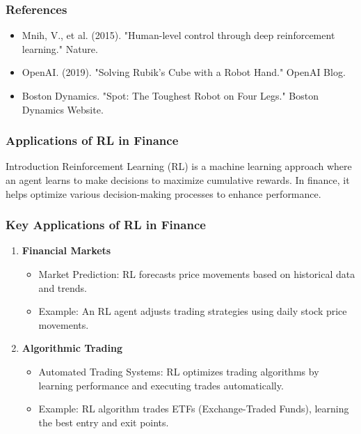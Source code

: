 \documentclass[aspectratio=169]{beamer}
\begin{document}
\begin{frame}[fragile]
    \frametitle{References}
    \begin{itemize}
        \item Mnih, V., et al. (2015). "Human-level control through deep reinforcement learning." Nature.
        \item OpenAI. (2019). "Solving Rubik's Cube with a Robot Hand." OpenAI Blog.
        \item Boston Dynamics. "Spot: The Toughest Robot on Four Legs." Boston Dynamics Website.
    \end{itemize}
\end{frame}

\begin{frame}
    \frametitle{Applications of RL in Finance}
    \begin{block}{Introduction}
        Reinforcement Learning (RL) is a machine learning approach where an agent learns to make decisions to maximize cumulative rewards. In finance, it helps optimize various decision-making processes to enhance performance.
    \end{block}
\end{frame}

\begin{frame}
    \frametitle{Key Applications of RL in Finance}
    \begin{enumerate}
        \item \textbf{Financial Markets}
            \begin{itemize}
                \item Market Prediction: RL forecasts price movements based on historical data and trends.
                \item Example: An RL agent adjusts trading strategies using daily stock price movements.
            \end{itemize}
        
        \item \textbf{Algorithmic Trading}
            \begin{itemize}
                \item Automated Trading Systems: RL optimizes trading algorithms by learning performance and executing trades automatically.
                \item Example: RL algorithm trades ETFs (Exchange-Traded Funds), learning the best entry and exit points.
            \end{itemize}
    \end{enumerate}
\end{frame}
\end{document}

